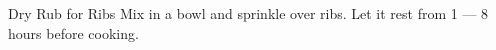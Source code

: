 \documentclass[../main.tex]{subfiles}
\begin{document}
\begin{recipe}{Dry Rub for Ribs}{}{}
    Mix in a bowl and sprinkle over ribs. Let
    it rest from 1 --- 8 hours before cooking.
\end{recipe}
\end{document}
